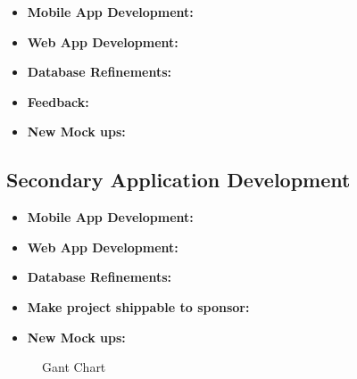 \documentclass[Letter,11pt]{article}
\begin{document}
		\begin{itemize}
			\item\textbf{Mobile App Development:}\\
			
			\item \textbf{Web App Development:}\\
			
			\item\textbf{Database Refinements:}\\
			
			\item\textbf{Feedback:}\\
			
			\item\textbf{New Mock ups:}\\
			
		\end{itemize}
		
	\subsection{Secondary Application Development}\label{dev2}
		
		\begin{itemize}
			\item\textbf{Mobile App Development:}\\
			
			\item \textbf{Web App Development:}\\
			
			
			\item\textbf{Database Refinements:}\\
			
			\item\textbf{Make project shippable to sponsor:}\\
			
			\item\textbf{New Mock ups:}\\
			
		\end{itemize}
		
		\begin{landscape}
			\begin{figure}
				
				\caption{\label{fig:gant}Gant Chart}
			\end{figure}
		\end{landscape}
	
\end{document}
